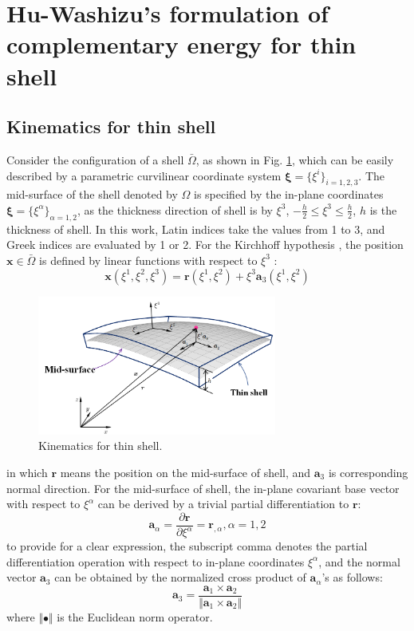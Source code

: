 \section{Hu-Washizu's formulation of complementary energy for thin shell}\label{Kinematics}
\subsection{Kinematics for thin shell}
Consider the configuration of a shell $\bar \Omega$, as shown in Fig. \ref{fig1}, which can be easily described by a parametric curvilinear coordinate system $\boldsymbol \xi = \{\xi^i\}_{i=1,2,3}$. The mid-surface of the shell denoted by $\Omega$ is specified by the in-plane coordinates $\boldsymbol \xi = \{\xi^\alpha\}_{\alpha=1,2}$, as the thickness direction of shell is by $\xi^3$, $-\frac{h}{2} \le \xi^3 \le \frac{h}{2}$, $h$ is the thickness of shell. In this work, Latin indices take the values from 1 to 3, and Greek indices are evaluated by 1 or 2. For the Kirchhoff hypothesis \cite{krysl1996}, the position $\boldsymbol x\in \bar \Omega$ is defined by linear functions with respect to $\xi^3$ :
\begin{equation}\label{x}
\boldsymbol x(\xi^1, \xi^2, \xi^3) = \boldsymbol r(\xi^1,\xi^2) + \xi^3 \boldsymbol a_3(\xi^1,\xi^2)
\end{equation}
\begin{figure}[!ht]
\centering
\includegraphics[width=0.7\textwidth]{figures/1}
\caption{Kinematics for thin shell.}\label{fig1}
\end{figure}
in which $\boldsymbol r$ means the position on the mid-surface of shell, and $\boldsymbol a_3$ is corresponding normal direction. For the mid-surface of shell, the in-plane covariant base vector with respect to $\xi^\alpha$ can be derived by a trivial partial differentiation to $\boldsymbol r$:
\begin{equation}
\boldsymbol a_\alpha = \frac{\partial \boldsymbol r}{\partial \xi^\alpha} = \boldsymbol r_{,\alpha}, \alpha  = 1,2
\end{equation}
to provide for a clear expression, the subscript comma denotes the partial differentiation operation with respect to in-plane coordinates $\xi^\alpha$, and the normal vector $\boldsymbol a_3$ can be obtained by the normalized cross product of $\boldsymbol a_{\alpha}$'s as follows:
\begin{equation}
\boldsymbol a_3 = \frac{\boldsymbol a_1 \times \boldsymbol a_2}{\Vert \boldsymbol a_1 \times \boldsymbol a_2 \Vert}
\end{equation}
where $\Vert \bullet \Vert$ is the Euclidean norm operator.

